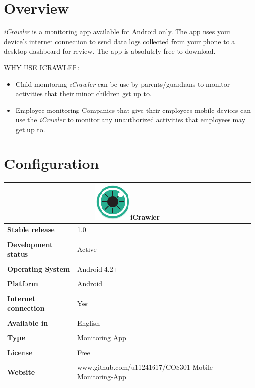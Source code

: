 \documentclass[hidelinks, 12pt, oneside]{article}
\begin{document}
	
	\tableofcontents
	\newpage
	
	\section{Overview}
	\emph{iCrawler} is a monitoring app available for Android only. The app
	 uses your device's internet connection to send data logs collected from your phone to a desktop-dashboard
	 for review. The app is absolutely free to download.\newline\newline
	 
	 \uppercase{Why use iCrawler:}\newline
	 \begin{itemize}
		\item Child monitoring\newline
		\emph{iCrawler} can be use by parents/guardians to monitor activities that their minor
		 children get up to.	
		\item Employee monitoring\newline
		Companies that give their employees mobile devices can use the \emph{iCrawler} to monitor any 
		unauthorized activities that employees may get up to.
	\end{itemize}
	\newpage
	
	
	\section{Configuration}
	
	\begin{tabular}{ |l|l| }  \multicolumn{2}{|c|}{\includegraphics[width=0.1 \textwidth]{img/icon.png}iCrawler}
	 \\ \hline\noalign{\smallskip} \textbf{Stable release} & 1.0
	  \\\\ \noalign{\smallskip} \textbf{Development status}& Active
	  \\\\ \noalign{\smallskip}\textbf{Operating System}& Android 4.2+
	  \\\\ \noalign{\smallskip}\textbf{Platform}& Android
	  \\\\ \noalign{\smallskip}\textbf{Internet connection} & Yes
	  \\\\ \noalign{\smallskip}\textbf{Available in} & English
	  \\\\ \noalign{\smallskip}\textbf{Type}& Monitoring App
	  \\\\ \noalign{\smallskip}\textbf{License}& Free
	  \\\\ \noalign{\smallskip}\textbf{Website}& www.github.com/u11241617/COS301-Mobile-Monitoring-App
	 \end{tabular}\newpage
	
\end{document}
